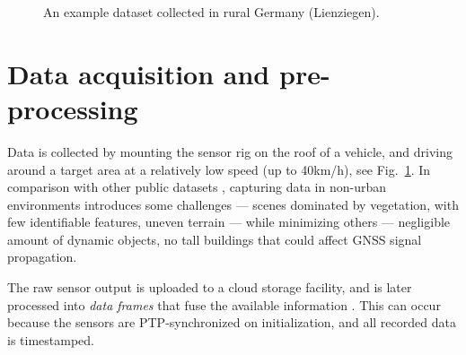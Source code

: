 \begin{figure}
	\centering
	\hspace{1pt}
	\caption[Example dataset trajectory]{An example dataset collected in rural Germany (Lienziegen).}
	\label{fig:example-trajectory}
\end{figure}


\section{Data acquisition and pre-processing}
\label{sec:data-acquisition}

Data is collected by mounting the sensor rig on the roof of a vehicle, and driving around a target area at a relatively low speed (\eg up to 40km/h), see Fig.~\ref{fig:example-trajectory}. In comparison with other public datasets \cite{nuscenes, pixset}, capturing data in non-urban environments introduces some challenges --- scenes dominated by vegetation, with few identifiable features, uneven terrain --- while minimizing others --- negligible amount of dynamic objects, no tall buildings that could affect GNSS signal propagation.

The raw sensor output is uploaded to a cloud storage facility, and is later processed into \emph{data frames} that fuse the available information . This can occur because the sensors are PTP-synchronized on initialization, and all recorded data is timestamped.


